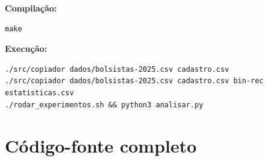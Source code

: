 \documentclass[11pt,a4paper]{article}
\begin{document}
\textbf{Compilação:}
\begin{lstlisting}[style=cmd]
make
\end{lstlisting}

\textbf{Execução:}
\begin{lstlisting}[style=cmd]
./src/copiador dados/bolsistas-2025.csv cadastro.csv
./src/copiador dados/bolsistas-2025.csv cadastro.csv bin-rec estatisticas.csv
./rodar_experimentos.sh && python3 analisar.py
\end{lstlisting}

\appendix
\section{Código-fonte completo}





\end{document}
